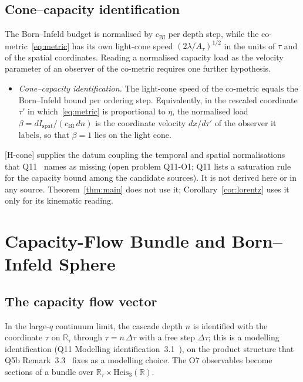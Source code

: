 \documentclass[11pt,a4paper]{article}
\begin{document}
    \subsection{Cone--capacity identification}

      The Born--Infeld budget is normalised by $c_{\mathrm{BI}}$ per depth step, while the co-metric~\eqref{eq:metric}
      has its own light-cone speed $(2\lambda/A_\tau)^{1/2}$ in the units of $\tau$ and of the spatial coordinates.
      Reading a normalised capacity load as the velocity parameter of an observer of the co-metric requires one
      further hypothesis.
      \begin{itemize}
        \item[{[H-cone]}] \emph{Cone--capacity identification.}
        The light-cone speed of the co-metric equals the Born--Infeld bound per ordering step.
        Equivalently, in the rescaled coordinate $\tau'$ in which~\eqref{eq:metric} is proportional to $\eta$, the
        normalised load $\beta = dI_{\mathrm{spat}}/(c_{\mathrm{BI}}\,dn)$ is the coordinate velocity $dx/d\tau'$ of
        the observer it labels, so that $\beta = 1$ lies on the light cone.
      \end{itemize}
      [H-cone] supplies the datum coupling the temporal and spatial normalisations that Q11~\cite{Beau2026q11}
      names as missing (open problem Q11-O1; Q11 lists a saturation rule for the capacity bound among the candidate
      sources).
      It is not derived here or in any source.
      Theorem~\ref{thm:main} does not use it; Corollary~\ref{cor:lorentz} uses it only for its kinematic reading.

  \section{Capacity-Flow Bundle and Born--Infeld Sphere}\label{sec:bundle}

    \subsection{The capacity flow vector}

      In the large-$q$ continuum limit, the cascade depth $n$ is identified with the coordinate
      $\tau$ on $\mathbb{R}_\tau$ through $\tau = n\,\Delta\tau$ with a free step $\Delta\tau$; this is a modelling
      identification (Q11 Modelling identification~3.1~\cite{Beau2026q11}), on the product structure that Q5b
      Remark~3.3~\cite{Beau2026q5b} fixes as a modelling choice.
      The O7 observables become sections of a bundle over $\mathbb{R}_\tau \times \mathrm{Heis}_3(\mathbb{R})$.
\end{document}
